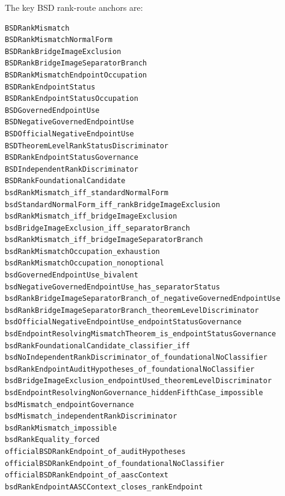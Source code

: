 \documentclass[11pt]{article}
\begin{document}
The key BSD rank-route anchors are:
\begin{verbatim}
BSDRankMismatch
BSDRankMismatchNormalForm
BSDRankBridgeImageExclusion
BSDRankBridgeImageSeparatorBranch
BSDRankMismatchEndpointOccupation
BSDRankEndpointStatus
BSDRankEndpointStatusOccupation
BSDGovernedEndpointUse
BSDNegativeGovernedEndpointUse
BSDOfficialNegativeEndpointUse
BSDTheoremLevelRankStatusDiscriminator
BSDRankEndpointStatusGovernance
BSDIndependentRankDiscriminator
BSDRankFoundationalCandidate
bsdRankMismatch_iff_standardNormalForm
bsdStandardNormalForm_iff_rankBridgeImageExclusion
bsdRankMismatch_iff_bridgeImageExclusion
bsdBridgeImageExclusion_iff_separatorBranch
bsdRankMismatch_iff_bridgeImageSeparatorBranch
bsdRankMismatchOccupation_exhaustion
bsdRankMismatchOccupation_nonoptional
bsdGovernedEndpointUse_bivalent
bsdNegativeGovernedEndpointUse_has_separatorStatus
bsdRankBridgeImageSeparatorBranch_of_negativeGovernedEndpointUse
bsdRankBridgeImageSeparatorBranch_theoremLevelDiscriminator
bsdOfficialNegativeEndpointUse_endpointStatusGovernance
bsdEndpointResolvingMismatchTheorem_is_endpointStatusGovernance
bsdRankFoundationalCandidate_classifier_iff
bsdNoIndependentRankDiscriminator_of_foundationalNoClassifier
bsdRankEndpointAuditHypotheses_of_foundationalNoClassifier
bsdBridgeImageExclusion_endpointUsed_theoremLevelDiscriminator
bsdEndpointResolvingNonGovernance_hiddenFifthCase_impossible
bsdMismatch_endpointGovernance
bsdMismatch_independentRankDiscriminator
bsdRankMismatch_impossible
bsdRankEquality_forced
officialBSDRankEndpoint_of_auditHypotheses
officialBSDRankEndpoint_of_foundationalNoClassifier
officialBSDRankEndpoint_of_aascContext
bsdRankEndpointAASCContext_closes_rankEndpoint
\end{verbatim}
\end{document}
